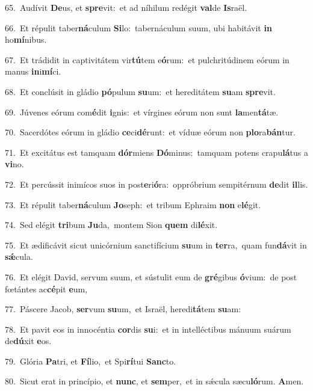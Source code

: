 {\numbfont\textcolor{\numbcolor}{65.}}~Audívit \textbf{De}\-us, et \textbf{spre}\-vit:~\star et ad níhilum redégit \textbf{val}\-de \textbf{Is}\-raël.\par
{\numbfont\textcolor{\numbcolor}{66.}}~Et répulit taber\-\textbf{ná}\-culum \textbf{Si}\-lo:~\star tabernáculum suum, ubi habitávit \textbf{in} ho\-\textbf{mí}\-nibus.\par
{\numbfont\textcolor{\numbcolor}{67.}}~Et trádidit in captivitátem vir\-\textbf{tú}\-tem e\-\textbf{ó}\-rum:~\star et pulchritúdinem eórum in manus \textbf{in}\-i\-\textbf{mí}\-ci.\par
{\numbfont\textcolor{\numbcolor}{68.}}~Et conclúsit in gládio \textbf{pó}\-pulum \textbf{su}\-um:~\star et hereditátem \textbf{su}\-am \textbf{spre}\-vit.\par
{\numbfont\textcolor{\numbcolor}{69.}}~Júvenes eórum com\-\textbf{é}\-dit \textbf{i}\-gnis:~\star et vírgines eórum non sunt \textbf{la}\-men\-\textbf{tá}\-tæ.\par
{\numbfont\textcolor{\numbcolor}{70.}}~Sacerdótes eórum in gládio \textbf{ce}\-ci\-\textbf{dé}\-runt:~\star et víduæ eórum non \textbf{plo}\-ra\-\textbf{bán}\-tur.\par
{\numbfont\textcolor{\numbcolor}{71.}}~Et excitátus est tamquam \textbf{dór}\-miens \textbf{Dó}\-minus:~\star tamquam potens crapu\-\textbf{lá}\-tus a \textbf{vi}\-no.\par
{\numbfont\textcolor{\numbcolor}{72.}}~Et percússit inimícos suos in post\-\textbf{e}\-ri\-\textbf{ó}\-ra:~\star oppróbrium sempitérnum \textbf{de}\-dit \textbf{il}\-lis.\par
{\numbfont\textcolor{\numbcolor}{73.}}~Et répulit taber\-\textbf{ná}\-culum \textbf{Jo}\-seph:~\star et tribum Ephraim \textbf{non} e\-\textbf{lé}\-git.\par
{\numbfont\textcolor{\numbcolor}{74.}}~Sed elégit \textbf{tri}\-bum \textbf{Ju}\-da,~\star montem Sion \textbf{quem} di\-\textbf{lé}\-xit.\par
{\numbfont\textcolor{\numbcolor}{75.}}~Et ædificávit sicut unicórnium sanctifícium \textbf{su}\-um in \textbf{ter}\-ra,~\star quam fun\-\textbf{dá}\-vit in \textbf{sǽ}\-cula.\par
{\numbfont\textcolor{\numbcolor}{76.}}~Et elégit David, servum suum, et sústulit eum de \textbf{gré}\-gibus \textbf{ó}\-vium:~\star de post fœtántes ac\-\textbf{cé}\-pit \textbf{e}\-um,\par
{\numbfont\textcolor{\numbcolor}{77.}}~Páscere Jacob, \textbf{ser}\-vum \textbf{su}\-um,~\star et Israël, heredi\-\textbf{tá}\-tem \textbf{su}\-am:\par
{\numbfont\textcolor{\numbcolor}{78.}}~Et pavit eos in innocéntia \textbf{cor}\-dis \textbf{su}\-i:~\star et in intelléctibus mánuum suárum de\-\textbf{dú}\-xit \textbf{e}\-os.\par
{\numbfont\textcolor{\numbcolor}{79.}}~Glória \textbf{Pa}\-tri, et \textbf{Fí}\-lio,~\star et Spi\-\textbf{rí}\-tui \textbf{Sanc}\-to.\par
{\numbfont\textcolor{\numbcolor}{80.}}~Sicut erat in princípio, et \textbf{nunc}\-, et \textbf{sem}\-per,~\star et in sǽcula sæcu\-\textbf{ló}\-rum. \textbf{A}\-men.\par
